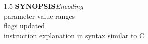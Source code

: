 


\begin{instructionblock}{1.5\imagewidth}
    \textbf{SYNOPSIS}\hfill\textit{Encoding}\\
    parameter value ranges\\
    {flags updated}\\
    instruction explanation in syntax similar to C
\end{instructionblock}

